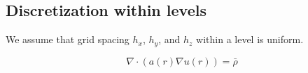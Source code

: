 \documentclass[10pt]{article}
\begin{document}
\newcommand{\indvar}{r}
 \newcommand{\uc}{u(\indvar)}

 \newcommand{\uxp}{u(\indvar+h_x)}
 \newcommand{\uxm}{u(\indvar-h_x)}
 \newcommand{\uxph}{u(\indvar+\frac{h_x}{2})}
 \newcommand{\uxmh}{u(\indvar-\frac{h_x}{2})}

 \newcommand{\uyp}{u(\indvar+h_y)}
 \newcommand{\uym}{u(\indvar-h_y)}
 \newcommand{\uyph}{u(\indvar+\frac{h_y}{2})}
 \newcommand{\uymh}{u(\indvar-\frac{h_y}{2})}

 \newcommand{\uzp}{u(\indvar+h_z)}
 \newcommand{\uzm}{u(\indvar-h_z)}
 \newcommand{\uzph}{u(\indvar+\frac{h_z}{2})}
 \newcommand{\uzmh}{u(\indvar-\frac{h_z}{2})}

 \newcommand{\ac}{a(\indvar)}
 \newcommand{\axph}{a(\indvar+\frac{h_x}{2})}
 \newcommand{\axmh}{a(\indvar-\frac{h_x}{2})}
 \newcommand{\ayph}{a(\indvar+\frac{h_y}{2})}
 \newcommand{\aymh}{a(\indvar-\frac{h_y}{2})}
 \newcommand{\azph}{a(\indvar+\frac{h_z}{2})}
 \newcommand{\azmh}{a(\indvar-\frac{h_z}{2})}

 \newcommand{\alc}{\alpha_{0}}
 \newcommand{\alxp}{\alpha_{x}}
 \newcommand{\alxm}{\alpha_{\bar{x}}}
 \newcommand{\alyp}{\alpha_{y}}
 \newcommand{\alym}{\alpha_{\bar{y}}}
 \newcommand{\alzp}{\alpha_{z}}
 \newcommand{\alzm}{\alpha_{\bar{z}}}

 \newcommand{\Uc}{U_{0}}
 \newcommand{\Uxp}{U_{x}}
 \newcommand{\Uxm}{U_{\bar{x}}}
 \newcommand{\Uyp}{U_{y}}
 \newcommand{\Uym}{U_{\bar{y}}}
 \newcommand{\Uzp}{U_{z}}
 \newcommand{\Uzm}{U_{\bar{z}}}

\subsection{Discretization within levels}

We assume that grid spacing $h_x$, $h_y$, and $h_z$ within a level is uniform.

\begin{center}
\begin{minipage}{1.5in}
\end{minipage} \[ \nabla\cdot(\ac \nabla \uc) = \bar{\rho} \]
\end{center}
\end{document}
